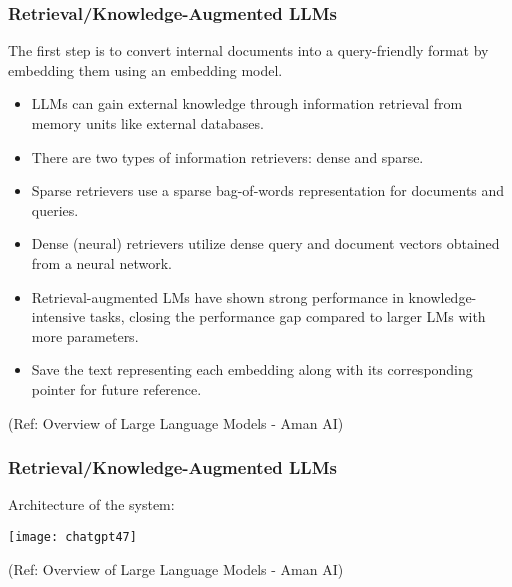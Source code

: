 \begin{frame}[fragile]\frametitle{Retrieval/Knowledge-Augmented LLMs}

The first step is to convert internal documents into a query-friendly format by embedding them using an embedding model.

\begin{itemize}
\item LLMs can gain external knowledge through information retrieval from memory units like external databases.
\item There are two types of information retrievers: dense and sparse.
\item Sparse retrievers use a sparse bag-of-words representation for documents and queries.
\item Dense (neural) retrievers utilize dense query and document vectors obtained from a neural network.
\item Retrieval-augmented LMs have shown strong performance in knowledge-intensive tasks, closing the performance gap compared to larger LMs with more parameters.
\item Save the text representing each embedding along with its corresponding pointer for future reference.
\end{itemize}

{\tiny (Ref: Overview of Large Language Models - Aman AI)}

\end{frame}

\begin{frame}[fragile]\frametitle{Retrieval/Knowledge-Augmented LLMs}

Architecture of the system:


		\begin{center}
		\texttt{[image: chatgpt47]}
		\end{center}

{\tiny (Ref: Overview of Large Language Models - Aman AI)}

\end{frame}

